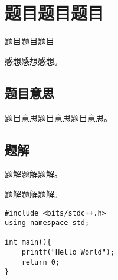 \def\sectionName{题目题目题目}
\section{\sectionName}



\begin{frame}

\isBeamerMode\relax
    {\Huge \sectionName}\par
\fi




感想感想感想。



\end{frame}

\subsection{题目意思}
\begin{frame} %
题目意思题目意思题目意思。
\end{frame}



\subsection{题解}
\begin{frame}
题解题解题解。
\end{frame}


\begin{frame}[fragile] %
题解题解题解。

\begin{lstlisting}[style=C++]
#include <bits/stdc++.h>
using namespace std;

int main(){
    printf("Hello World");
    return 0;
}
\end{lstlisting}
\end{frame}
